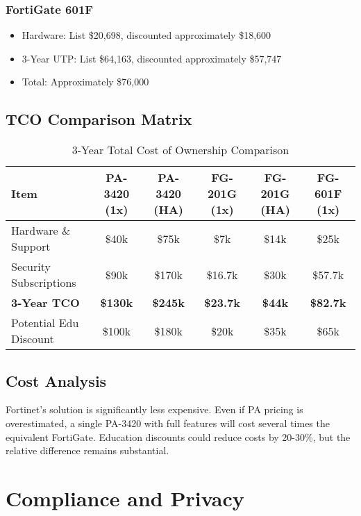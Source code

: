 \documentclass[12pt]{article}
\begin{document}
\subsubsection{FortiGate 601F}
\begin{itemize}
    \item Hardware: List \$20,698, discounted approximately \$18,600 \cite{fortigate601fallfirewalls}
    \item 3-Year UTP: List \$64,163, discounted approximately \$57,747 \cite{fortigate601fallfirewalls}
    \item Total: Approximately \$76,000
\end{itemize}

\subsection{TCO Comparison Matrix}

\begin{table}[H]
\centering
\caption{3-Year Total Cost of Ownership Comparison}
\begin{tabular}{lccccc}
\toprule
\textbf{Item} & \textbf{PA-3420 (1x)} & \textbf{PA-3420 (HA)} & \textbf{FG-201G (1x)} & \textbf{FG-201G (HA)} & \textbf{FG-601F (1x)} \\
\midrule
Hardware \& Support & \$40k & \$75k & \$7k & \$14k & \$25k \\
Security Subscriptions & \$90k & \$170k & \$16.7k & \$30k & \$57.7k \\
\textbf{3-Year TCO} & \textbf{\$130k} & \textbf{\$245k} & \textbf{\$23.7k} & \textbf{\$44k} & \textbf{\$82.7k} \\
Potential Edu Discount & \$100k & \$180k & \$20k & \$35k & \$65k \\
\bottomrule
\end{tabular}
\end{table}

\subsection{Cost Analysis}

Fortinet's solution is significantly less expensive. Even if PA pricing is overestimated, a single PA-3420 with full features will cost several times the equivalent FortiGate. Education discounts could reduce costs by 20-30\%, but the relative difference remains substantial.

\section{Compliance and Privacy}
\end{document}
